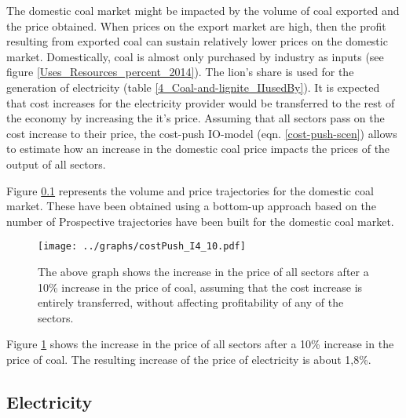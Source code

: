 \documentclass[12pt,english]{article}
\begin{document}


The domestic coal market might be impacted by the volume of coal exported and the price obtained. When prices on the export market are high, then the profit resulting from exported coal can sustain relatively lower prices on the domestic market. Domestically, coal is almost only purchased by industry as inputs (see figure \ref{Uses_Resources_percent_2014}). The lion's share is used for the generation of electricity (table \ref{4_Coal-and-lignite_IIusedBy}). It is expected that cost increases for the electricity provider would be transferred to the rest of the economy by increasing the it's price. Assuming that all sectors pass on the cost increase to their price, the cost-push IO-model (eqn. \ref{cost-push-scen}) allows to estimate how an increase in the domestic coal price impacts the prices of the output of all sectors. 

Figure \ref{} represents the volume and price trajectories for the domestic coal market. These have been obtained using a bottom-up approach based on the number of 
Prospective trajectories have been built for the domestic coal market. 


\begin{figure}[!h]
	\hspace{-10pt}\texttt{[image: ../graphs/costPush\_I4\_10.pdf]}
	\caption{\label{costPush_I4_10} The above graph shows the increase in the price of all sectors after a 10\% increase in the price of coal, assuming that the cost increase is entirely transferred, without affecting profitability of any of the sectors.}
\end{figure}


Figure \ref{costPush_I4_10} shows the increase in the price of all sectors after a 10\% increase in the price of coal. The resulting increase of the price of electricity is about 1,8\%.


\subsection{Electricity}
\end{document}
